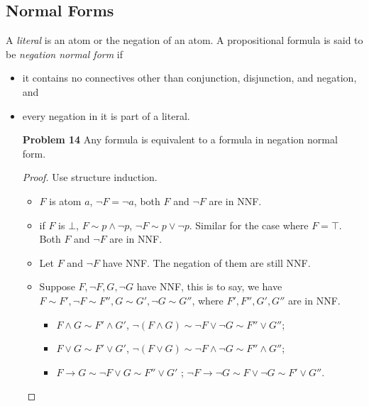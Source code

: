 \begin{enumerate}
\end{enumerate}

\subsection{Normal Forms} %
A \textit{literal} is an atom or the negation of an atom. A propositional formula is said to be \textit{negation normal form} if 
\begin{itemize}
    \item it contains no connectives other than conjunction, disjunction, and negation, and 
    \item every negation in it is part of a literal. 
\end{itemize}

\begin{enumerate}
\item[\textbf{Problem 14}] Any formula is equivalent to a formula in negation normal form.  
\begin{proof}
Use structure induction. 
\begin{itemize}
\item $F$ is atom $a$, $\neg F = \neg a$, both $F$ and $\neg F$ are in NNF.  
\item if $F$ is $\bot$, $ F \sim p \wedge \neg p$, $\neg F \sim p \vee \neg p$. Similar for the case where $F = \top$. Both $F$ and $\neg F$ are in NNF. 
\item Let $F$ and $\neg F$ have NNF. The negation of them are still NNF. 
\item Suppose $F, \neg F, G, \neg G$ have NNF, this is to say, we have $F \sim F', \neg F \sim F'', G \sim G', \neg G \sim G''$, where $F', F'', G', G''$ are in NNF. 
    \begin{itemize}
        \item $F \wedge G \sim F' \wedge G'$,  \quad $\neg (F \wedge G) \sim \neg F \vee \neg G \sim F'' \vee G''$;
        \item $F \vee G \sim F' \vee G'$,  \quad $\neg (F \vee G) \sim \neg F \wedge \neg G \sim F'' \wedge G''$;
        \item $F \rightarrow G \sim \neg F \vee G \sim F'' \vee G'$ ; \quad $\neg F \rightarrow \neg G \sim F \vee \neg G \sim F' \vee G''$. 
        
    \end{itemize}
\end{itemize}
\end{proof}
\end{enumerate}

